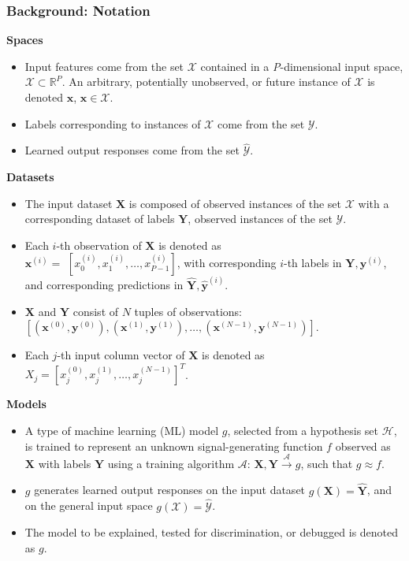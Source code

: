 \documentclass[11pt,aspectratio=169,hyperref={colorlinks}]{beamer}
\begin{document}
		\begin{frame}[allowframebreaks]
	
			\frametitle{Background: Notation}
			
			\textbf{Spaces} 
			
			\begin{itemize}
				\item Input features come from the set $\mathcal{X}$ contained in a \textit{P}-dimensional input space, $\mathcal{X} \subset \mathbb{R}^P$.  An arbitrary, potentially unobserved, or future instance of $\mathcal{X}$ is denoted $\mathbf{x}$, $\mathbf{x} \in \mathcal{X}$.
				\item Labels corresponding to instances of $\mathcal{X}$ come from the set $\mathcal{Y}$.
				\item Learned output responses come from the set $\mathcal{\hat{Y}}$.
			\end{itemize}	
			
			\framebreak	
			
			\textbf{Datasets} 
			
			\begin{itemize}
				\item The input dataset $\mathbf{X}$ is composed of observed instances of the set $\mathcal{X}$ with a corresponding dataset of labels $\mathbf{Y}$, observed instances of the set $\mathcal{Y}$. 
				\item Each $i$-th observation of $\mathbf{X}$ is denoted as\\ $\mathbf{x}^{(i)} = $  
				$[x_0^{(i)}, x_1^{(i)}, \dots, x_{\textit{P}-1}^{(i)}]$, with corresponding $i$-th labels in $\mathbf{Y}, \mathbf{y}^{(i)}$, and corresponding predictions in $\mathbf{\hat{Y}}, \mathbf{\hat{y}}^{(i)}$.
				\item $\mathbf{X}$ and $\mathbf{Y}$ consist of $N$ tuples of observations:\\ $[(\mathbf{x}^{(0)},\mathbf{y}^{(0)}), (\mathbf{x}^{(1)},\mathbf{y}^{(1)}), \dots,(\mathbf{x}^{(N-1)},\mathbf{y}^{(N-1)})]$.
				\item Each $j$-th input column vector of $\mathbf{X}$ is denoted as $X_j = [x_{j}^{(0)}, x_{j}^{(1)}, \dots, x_{j}^{(N-1)}]^T$.
			\end{itemize}	 
			
			\framebreak
			
			\textbf{Models}
			
			\begin{itemize}
				\item A type of machine learning (ML) model $g$, selected from a hypothesis set $\mathcal{H}$, is trained to represent an unknown signal-generating function $f$ observed as  $\mathbf{X}$ with labels $\mathbf{Y}$ using a training algorithm $\mathcal{A}$: 
				$ \mathbf{X}, \mathbf{Y} \xrightarrow{\mathcal{A}} g$, such that $g \approx f$.
				\item $g$ generates learned output responses on the input dataset $g(\mathbf{X}) = \mathbf{\hat{Y}}$, and on the general input space $g(\mathcal{X}) = \mathcal{\hat{Y}}$.
				\item The model to be explained, tested for discrimination, or debugged is denoted as $g$.
			\end{itemize}
			

\end{frame}
\end{document}
